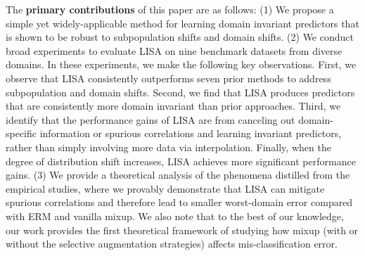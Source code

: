 The \textbf{primary contributions} of this paper are as follows: (1) We propose a simple yet widely-applicable method for learning domain invariant predictors that is shown to be robust to subpopulation shifts and domain shifts. (2) We conduct broad experiments to evaluate LISA on nine benchmark datasets from diverse domains. In these experiments, we make the following key observations. First, we observe that LISA consistently outperforms seven prior methods to address subpopulation and domain shifts. Second, we find that LISA produces predictors that are consistently more domain invariant than prior approaches. Third, we identify that the performance gains of LISA are from canceling out domain-specific information or spurious correlations and learning invariant predictors, rather than simply involving more data via interpolation. Finally, when the degree of distribution shift increases, LISA achieves more significant performance gains. (3) We provide a theoretical analysis of the phenomena distilled from the empirical studies, where we provably demonstrate that LISA can mitigate spurious correlations and therefore lead to smaller worst-domain error compared with ERM and vanilla mixup. We also note that to the best of our knowledge, our work provides the first theoretical framework of studying how mixup (with or without the selective augmentation strategies) affects mis-classification error. 